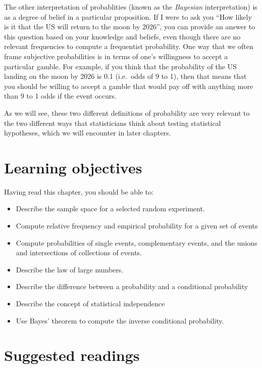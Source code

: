 \documentclass[12pt,]{book}
\providecommand{\tightlist}{%
  \setlength{\itemsep}{0pt}\setlength{\parskip}{0pt}}
\theoremstyle{definition}
\theoremstyle{definition}
\theoremstyle{definition}
\theoremstyle{remark}
\begin{document}
The other interpretation of probablities (known as the \emph{Bayesian} interpretation) is as a degree of belief in a particular proposition. If I were to ask you ``How likely is it that the US will return to the moon by 2026'', you can provide an answer to this question based on your knowledge and beliefs, even though there are no relevant frequencies to compute a frequentist probability. One way that we often frame subjective probabilities is in terms of one's willingness to accept a particular gamble. For example, if you think that the probability of the US landing on the moon by 2026 is 0.1 (i.e.~odds of 9 to 1), then that means that you should be willing to accept a gamble that would pay off with anything more than 9 to 1 odds if the event occurs.

As we will see, these two different definitions of probability are very relevant to the two different ways that statisticians think about testing statistical hypotheses, which we will encounter in later chapters.

\hypertarget{learning-objectives-5}{%
\section{Learning objectives}\label{learning-objectives-5}}

Having read this chapter, you should be able to:

\begin{itemize}
\tightlist
\item
  Describe the sample space for a selected random experiment.
\item
  Compute relative frequency and empirical probability for a given set of events
\item
  Compute probabilities of single events, complementary events, and the unions and intersections of collections of events.
\item
  Describe the law of large numbers.
\item
  Describe the difference between a probability and a conditional probability
\item
  Describe the concept of statistical independence
\item
  Use Bayes' theorem to compute the inverse conditional probability.
\end{itemize}

\hypertarget{suggested-readings-3}{%
\section{Suggested readings}\label{suggested-readings-3}}
\end{document}
